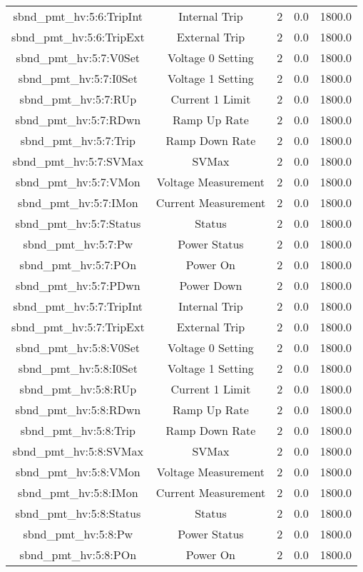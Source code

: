 \begin{table}[ptb]
\begin{tabular}{c | c c c c}
sbnd_pmt_hv:5:6:TripInt & Internal Trip & 2 & 0.0 & 1800.0\\ 
sbnd_pmt_hv:5:6:TripExt & External Trip & 2 & 0.0 & 1800.0\\ 
sbnd_pmt_hv:5:7:V0Set & Voltage 0 Setting & 2 & 0.0 & 1800.0\\ 
sbnd_pmt_hv:5:7:I0Set & Voltage 1 Setting & 2 & 0.0 & 1800.0\\ 
sbnd_pmt_hv:5:7:RUp & Current 1 Limit & 2 & 0.0 & 1800.0\\ 
sbnd_pmt_hv:5:7:RDwn & Ramp Up Rate & 2 & 0.0 & 1800.0\\ 
sbnd_pmt_hv:5:7:Trip & Ramp Down Rate & 2 & 0.0 & 1800.0\\ 
sbnd_pmt_hv:5:7:SVMax & SVMax & 2 & 0.0 & 1800.0\\ 
sbnd_pmt_hv:5:7:VMon & Voltage Measurement & 2 & 0.0 & 1800.0\\ 
sbnd_pmt_hv:5:7:IMon & Current Measurement & 2 & 0.0 & 1800.0\\ 
sbnd_pmt_hv:5:7:Status & Status & 2 & 0.0 & 1800.0\\ 
sbnd_pmt_hv:5:7:Pw & Power Status & 2 & 0.0 & 1800.0\\ 
sbnd_pmt_hv:5:7:POn & Power On & 2 & 0.0 & 1800.0\\ 
sbnd_pmt_hv:5:7:PDwn & Power Down & 2 & 0.0 & 1800.0\\ 
sbnd_pmt_hv:5:7:TripInt & Internal Trip & 2 & 0.0 & 1800.0\\ 
sbnd_pmt_hv:5:7:TripExt & External Trip & 2 & 0.0 & 1800.0\\ 
sbnd_pmt_hv:5:8:V0Set & Voltage 0 Setting & 2 & 0.0 & 1800.0\\ 
sbnd_pmt_hv:5:8:I0Set & Voltage 1 Setting & 2 & 0.0 & 1800.0\\ 
sbnd_pmt_hv:5:8:RUp & Current 1 Limit & 2 & 0.0 & 1800.0\\ 
sbnd_pmt_hv:5:8:RDwn & Ramp Up Rate & 2 & 0.0 & 1800.0\\ 
sbnd_pmt_hv:5:8:Trip & Ramp Down Rate & 2 & 0.0 & 1800.0\\ 
sbnd_pmt_hv:5:8:SVMax & SVMax & 2 & 0.0 & 1800.0\\ 
sbnd_pmt_hv:5:8:VMon & Voltage Measurement & 2 & 0.0 & 1800.0\\ 
sbnd_pmt_hv:5:8:IMon & Current Measurement & 2 & 0.0 & 1800.0\\ 
sbnd_pmt_hv:5:8:Status & Status & 2 & 0.0 & 1800.0\\ 
sbnd_pmt_hv:5:8:Pw & Power Status & 2 & 0.0 & 1800.0\\ 
sbnd_pmt_hv:5:8:POn & Power On & 2 & 0.0 & 1800.0\\ 

\end{tabular}
\end{table}
